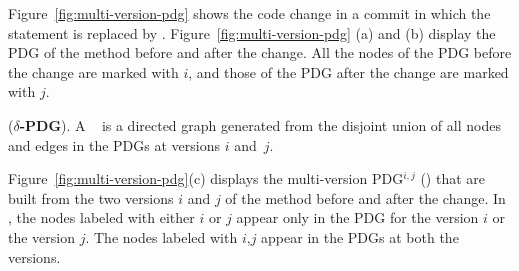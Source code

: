 
Figure~\ref{fig:multi-version-pdg} shows the code change in a commit
in which the statement  is replaced by
. Figure~\ref{fig:multi-version-pdg} (a) and
(b) display the PDG of the method  before and after
the change. All the nodes of the PDG before the change are marked with
$i$, and those of the PDG after the change are marked with $j$.


\begin{Definition} ({\bf $\delta$-PDG}).
A {\mvpdg}~\cite{flexeme-fse20} is a directed graph generated from the
disjoint union of all nodes and edges in the PDGs at versions $i$
and~$j$.
%
\end{Definition}

Figure~\ref{fig:multi-version-pdg}(c) displays the multi-version
PDG$^{i,j}$ ({\mvpdg}) that are built from the two
versions $i$ and $j$ of the method  before and after
the change. In {\mvpdg}, the nodes labeled with either $i$
or $j$ appear only in the PDG for the version $i$ or the version $j$.
The nodes labeled with $i$,$j$ appear in the PDGs at both the
versions.


